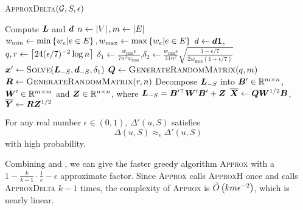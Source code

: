 \documentclass[sigconf]{acmart}
\begin{document}
\begin{algorithm}
    \caption{\textsc{ApproxDelta}\((\mathcal{G},S,\epsilon)\)}
    \label{algo:approxdelta}
    Compute \(\boldsymbol{L}\) and \(\boldsymbol{d}\)\;
    \(n\gets\left|V \right|,m\gets\left|E \right|\)\;
    \(w_{\min}\gets\min\left\{w_e|e\in E \right\},w_{\max}\gets\max\left\{w_e|e\in E \right\}\)\;
    \(d\gets\boldsymbol{d}\boldsymbol{1}\),\(q,r\gets\left\lceil24(\epsilon/7)^{-2}\log n\right\rceil\)\;
    \(\delta_1\gets \frac{w_{\min}\epsilon}{7n^2w_{\max}}\),\(\delta_2\gets \frac{w_{\min}\epsilon}{31n^2}\sqrt{\frac{1-\epsilon/7}{2w_{\max}(1+\epsilon/7)}}\)\;
    \(\boldsymbol{x}'\gets\textsc{Solve}(\boldsymbol{L}_{-S},\boldsymbol{d}_{-S},\delta_1)\)\;
    \(\boldsymbol{Q}\gets\textsc{GenerateRandomMatrix}(q,m)\)\;
    \(\boldsymbol{R}\gets\textsc{GenerateRandomMatrix}(r,n)\)\;
    Decompose \(\boldsymbol{L}_{-S}\) into \(\boldsymbol{B}'\in\mathbb{R}^{m\times n}\), \(\boldsymbol{W}'\in\mathbb{R}^{m\times m}\) and \(\boldsymbol{Z}\in\mathbb{R}^{n\times n}\), where \(\boldsymbol{L}_{-S}=\boldsymbol{B}'^\top\boldsymbol{W}'\boldsymbol{B}'+\boldsymbol{Z}\)\;
    \(\overline{\boldsymbol{X}}\gets\boldsymbol{Q}\boldsymbol{W}^{1/2}\boldsymbol{B}\),\(\overline{\boldsymbol{Y}}\gets\boldsymbol{R}\boldsymbol{Z}^{1/2}\)\;

\end{algorithm}

\begin{lemma}\label{lem:approx-marginest}
    For any real number \(\epsilon\in(0,1)\), \(\Delta'(u,S)\) satisfies
    \[\Delta(u,S)\approx_\epsilon \Delta'(u,S)\]
    with high probability.
\end{lemma}


Combining  and , we can give the faster greedy algorithm \textsc{Approx} with a \(1-\frac{k}{k-1}\cdot\frac{1}{e}-\epsilon\) approximate factor.
Since \textsc{Approx} calls \textsc{ApproxH} once and calls \textsc{ApproxDelta} \(k-1\) times, the complexity of \textsc{Approx} is \(\tilde{O}\left( km\epsilon^{-2} \right)\), which is nearly linear.
\end{document}
